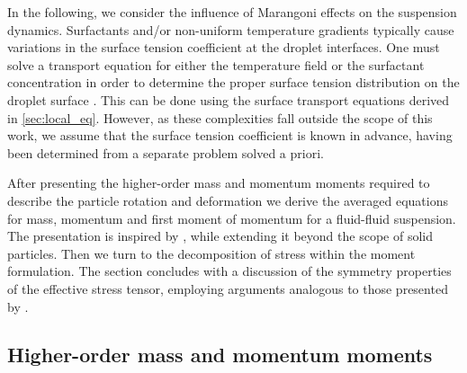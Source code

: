 In the following, we consider the influence of Marangoni effects on the suspension dynamics. Surfactants and/or non-uniform temperature gradients typically cause variations in the surface tension coefficient at the droplet interfaces. 
One must solve a transport equation for either the temperature field or the surfactant concentration in order to determine the proper surface tension distribution on the droplet surface \citep{Subramanian_1985,leal2007advanced}. 
This can be done using the surface transport equations derived in \ref{sec:local_eq}. 
However, as these complexities fall outside the scope of this work, we assume that the surface tension coefficient is known in advance, having been determined from a separate problem solved a priori.



After presenting the higher-order mass and momentum moments required to describe the particle rotation and deformation we derive the averaged equations for mass, momentum and first moment of momentum for a fluid-fluid suspension.
The presentation is inspired by \citep{lhuillier2009rheology}, while extending it beyond the scope of solid particles.
Then we turn to the decomposition of stress within the moment formulation. 
The section concludes with a discussion of the symmetry properties of the effective stress tensor, employing arguments analogous to those presented by \citet{lhuillier1996contribution}.



\subsection{Higher-order mass and momentum moments}



